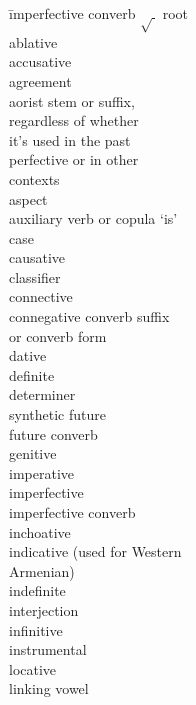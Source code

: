 \begin{multicols}{2}
\begin{tabbing}
	{\impfcvb} \= imperfective converb\kill
	$\sqrt{~}$ \> root \\
	{\abl}  \> 	ablative\\
	{\acc}	\> accusative\\
	{\agr}  \> 	agreement\\
	{\aor}	\> aorist stem or suffix, \\
	        \> regardless of whether\\ 
			\> it's used in the past \\
			\> perfective or in other \\
			\> contexts\\
	{\asp}  \> 	aspect\\
{\auxgloss} \> 	auxiliary  verb or copula `is'\\%
	{\case} \>	case \\
	{\caus} \> 	causative \\
	{\cl}	\> classifier \\
	{\con} \> connective \\ 
	{\cncvb} \> connegative converb suffix \\
	         \> or converb form\\
	{\dat}	\> dative  \\
	{} \> 	definite  \\
	{\detgloss} \> 	determiner \\ 
	{\fut}	\> synthetic future\\
	{\futcvb}	\> future converb \\
	{\gen} \> 	genitive \\
	{\imp}	\> imperative\\
	{\impf}	 \> imperfective \\
	{\impfcvb} \> 	imperfective converb \\
	{\inch}	\> inchoative \\
	{\ind} \> 	indicative  (used for Western \\ \> Armenian)\\
	{\indf}	\> indefinite  \\
	{\inj}	\> interjection\\
	{\infgloss} \>	infinitive \\
	{\ins} \> 	instrumental \\
	{\locgloss}\> 	locative \\
	{\lvgloss}	\> linking vowel\\

\end{tabbing}
\end{multicols}
